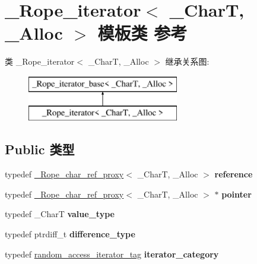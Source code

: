 \hypertarget{class___rope__iterator}{}\section{\+\_\+\+Rope\+\_\+iterator$<$ \+\_\+\+CharT, \+\_\+\+Alloc $>$ 模板类 参考}
\label{class___rope__iterator}
类 \+\_\+\+Rope\+\_\+iterator$<$ \+\_\+\+CharT, \+\_\+\+Alloc $>$ 继承关系图\+:\begin{figure}[H]
\begin{center}
\leavevmode
\includegraphics[height=2.000000cm]{class___rope__iterator}
\end{center}
\end{figure}
\subsection*{Public 类型}
\begin{DoxyCompactItemize}
\item 
\mbox{\label{class___rope__iterator_a7c97a97aedcf40664c6021bae2718116}} 
typedef \hyperlink{class___rope__char__ref__proxy}{\+\_\+\+Rope\+\_\+char\+\_\+ref\+\_\+proxy}$<$ \+\_\+\+CharT, \+\_\+\+Alloc $>$ {\bfseries reference}
\item 
\mbox{\label{class___rope__iterator_a87034891346075ccd7a46c24915a8c4c}} 
typedef \hyperlink{class___rope__char__ref__proxy}{\+\_\+\+Rope\+\_\+char\+\_\+ref\+\_\+proxy}$<$ \+\_\+\+CharT, \+\_\+\+Alloc $>$ $\ast$ {\bfseries pointer}
\item 
\mbox{\label{class___rope__iterator_a007b6453f8acef6848decf6a1ffa8954}} 
typedef \+\_\+\+CharT {\bfseries value\+\_\+type}
\item 
\mbox{\label{class___rope__iterator_a4bfd8c2db510ab531a74ab264ec79ec5}} 
typedef ptrdiff\+\_\+t {\bfseries difference\+\_\+type}
\item 
\mbox{\label{class___rope__iterator_a87c39914b244dbd5f9c2586f89e3cb9b}} 
typedef \hyperlink{structrandom__access__iterator__tag}{random\+\_\+access\+\_\+iterator\+\_\+tag} {\bfseries iterator\+\_\+category}
\end{DoxyCompactItemize}
